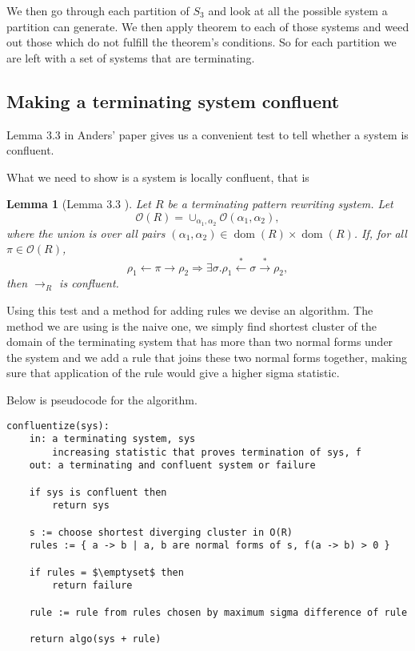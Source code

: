 \documentclass[a4paper, 11pt, english]{article}
\newtheorem{lemma}[theorem]{Lemma}
\theoremstyle{definition}
\newcommand{\Sym}{S}
\newcommand{\Ocal}{\mathcal{O}}
\newcommand{\from}{\leftarrow}
\newcommand{\tostar}{\stackrel{*}{\to}}
\newcommand{\fromstar}{\stackrel{*}{\from}}
\DeclareMathOperator{\dom}{dom}
\begin{document}
We then go through each partition of $\Sym_3$ and look at all the possible
system a partition can generate. We then apply theorem to each of those systems
and weed out those which do not fulfill the theorem's conditions. So for each
partition we are left with a set of systems that are terminating.

\subsection{Making a terminating system confluent}
Lemma $3.3$ in Anders' paper gives us a convenient test to tell whether a system is
confluent. 

What we need to show is a system is locally confluent, that is
\begin{lemma}[Lemma 3.3 \cite{claesson:2021}]
    Let $R$ be a terminating pattern rewriting system. Let 
    \begin{equation*}
        \Ocal(R) = \cup_{\alpha_1, \alpha_2} \Ocal(\alpha_1, \alpha_2),
    \end{equation*}
    where the union is over all pairs $(\alpha_1, \alpha_2) \in \dom(R) \times \dom(R)$. If, for all
    $\pi \in \Ocal(R)$,
    \begin{equation*}
        \rho_1 \from \pi \to \rho_2 \Longrightarrow \exists \sigma. \rho_1 \fromstar \sigma \tostar
        \rho_2,
    \end{equation*}
    then $\to_R$ is confluent.
        
\end{lemma}

Using this test and a method for adding rules we devise an algorithm. The method we are using is the
naive one, we simply find shortest cluster of the domain of the terminating system that has more than two
normal forms under the system and we add a rule that joins these two normal forms together, making
sure that application of the rule would give a higher sigma statistic.

Below is pseudocode for the algorithm.

\lstset{basicstyle=\footnotesize\ttfamily, frame=single, breaklines=true,
mathescape=true}
\begin{minipage}{\linewidth}
\begin{lstlisting}[title={Algorithm 1}]
confluentize(sys):
    in: a terminating system, sys
        increasing statistic that proves termination of sys, f
    out: a terminating and confluent system or failure

    if sys is confluent then
        return sys

    s := choose shortest diverging cluster in O(R)
    rules := { a -> b | a, b are normal forms of s, f(a -> b) > 0 }

    if rules = $\emptyset$ then
        return failure

    rule := rule from rules chosen by maximum sigma difference of rule

    return algo(sys + rule)
\end{lstlisting}
\end{minipage}
\end{document}
